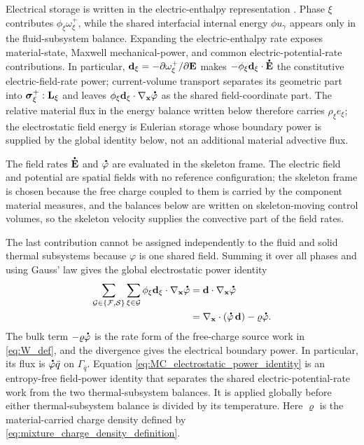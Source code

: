 Electrical storage is written in the electric-enthalpy representation
\cite{montanaro2015thermo_electroelasticity}.  Phase \(\xi\) contributes
\(\phi_\xi\omega_\xi^+\), while the shared interfacial internal energy
\(\phi u_\gamma\) appears only in the fluid-subsystem balance.  Expanding the electric-enthalpy
rate exposes material-state, Maxwell mechanical-power, and common
electric-potential-rate contributions.  In particular,
\(\mathbf{d}_\xi=-\partial\omega_\xi^+/\partial\mathbf{E}\) makes
\(-\phi_\xi\mbf d_\xi\cdot\phasedot{\mbf E}\) the constitutive electric-field-rate
power; current-volume transport separates its geometric part into
\(\boldsymbol{\sigma}_\xi^+:\mathbf{L}_\xi\) and leaves
	\(\phi_\xi\mbf d_\xi\cdot\nabla_{\mbf x}\phasedot\varphi\) as the shared
	field-coordinate part.  The relative material flux in the energy balance
	written below therefore carries \(\rho_\xi e_\xi\); the
electrostatic field energy is Eulerian storage whose boundary power is supplied
by the global identity below, not an additional material advective flux.

The field rates \(\phasedot{\mbf E}\) and \(\phasedot\varphi\) are evaluated in the
skeleton frame.  The electric field and potential are spatial fields with no
reference configuration; the skeleton frame is chosen because the free charge
coupled to them is carried by the component material measures, and the balances
below are written on skeleton-moving control volumes, so the skeleton velocity
supplies the convective part of the field rates.

The last contribution cannot be
assigned independently to the fluid and solid thermal subsystems because
\(\varphi\) is one shared field.  Summing it over all phases and using Gauss'
law gives the global electrostatic power identity
%
\begin{align}
	\sum_{\mc G\in\{\mc F,\mc S\}}
	\sum_{\xi\in\mc G}
	\phi_\xi\mbf d_\xi\cdot\nabla_{\mbf x}\phasedot\varphi
	&=
	\mbf d\cdot\nabla_{\mbf x}\phasedot\varphi
	\notag \\
	&=
	\nabla_{\mbf x}\cdot
	\left(
	\phasedot\varphi\,\mbf d
	\right)
	-
	\varrho\phasedot\varphi .
	\label{eq:MC_electrostatic_power_identity}
\end{align}
%
The bulk term \(-\varrho\phasedot\varphi\) is the rate form of the free-charge
source work in \eqref{eq:W_def}, and the divergence gives the electrical
boundary power.  In particular, its flux is
\(\phasedot\varphi\bar q\) on \(\Gamma_{\bar q}\).  Equation
\eqref{eq:MC_electrostatic_power_identity} is an entropy-free field-power
identity that separates the shared electric-potential-rate work from the two
thermal-subsystem balances.  It is applied globally before either
	thermal-subsystem balance is divided by its temperature.  Here \(\varrho\) is
	the material-carried charge density defined by
\eqref{eq:mixture_charge_density_definition}.

